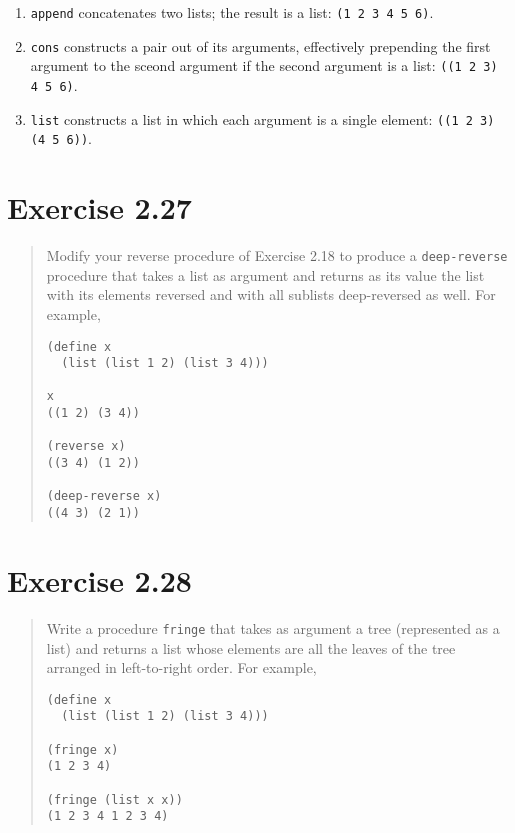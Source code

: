 \documentclass{article}
\begin{document}
\begin{enumerate}
    \item \texttt{append} concatenates two lists; the result is a list:
        \texttt{(1 2 3 4 5 6)}.
    \item \texttt{cons} constructs a pair out of its arguments, effectively
        prepending the first argument to the sceond argument if the second
        argument is a list: \texttt{((1 2 3) 4 5 6)}.
    \item \texttt{list} constructs a list in which each argument is a single
        element: \texttt{((1 2 3) (4 5 6))}.
\end{enumerate}

\section{Exercise 2.27}
\begin{quote}
    Modify your reverse procedure of Exercise 2.18 to produce a
    \texttt{deep-reverse} procedure that takes a list as argument and returns
    as its value the list with its elements reversed and with all sublists
    deep-reversed as well. For example,
    \begin{lstlisting}
(define x
  (list (list 1 2) (list 3 4)))

x
((1 2) (3 4))

(reverse x)
((3 4) (1 2))

(deep-reverse x)
((4 3) (2 1))
    \end{lstlisting}
\end{quote}



\section{Exercise 2.28}
\begin{quote}
    Write a procedure \texttt{fringe} that takes as argument a tree
    (represented as a list) and returns a list whose elements are all the
    leaves of the tree arranged in left-to-right order. For example,
    \begin{lstlisting}
(define x
  (list (list 1 2) (list 3 4)))

(fringe x)
(1 2 3 4)

(fringe (list x x))
(1 2 3 4 1 2 3 4)
    \end{lstlisting}
\end{quote}


\end{document}
